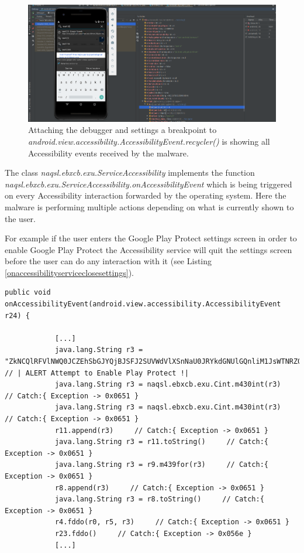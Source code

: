 \documentclass[10pt,titlepage]{article}
\begin{document}

\begin{figure}[H]
  \begin{center}
  \includegraphics[width=\linewidth]{accessibility_event_bp.png}
  \end{center}
  \caption{Attaching the debugger and settings a breakpoint to \textit{android.view.accessibility.AccessibilityEvent.recycler()} is showing all Accessibility events received by the malware.}
  \label{fig:accessibility_event_bp}
\end{figure}


The class \textit{naqsl.ebxcb.exu.ServiceAccessibility} implements the function \textit{naqsl.ebxcb.exu.ServiceAccessibility.onAccessibilityEvent} which is being triggered on every Accessibility interaction forwarded by the operating system. Here the malware is performing multiple actions depending on what is currently shown to the user.

For example if the user enters the Google Play Protect settings screen in order to enable Google Play Protect the Accessibility service will quit the settings screen before the user can do any interaction with it (see Listing \ref{onaccessibilityserviceclosesettings}).

\newpage
\begin{lstlisting}[label=onaccessibilityserviceclosesettings,caption=The \textit{AccessiblityService} is able to detect wether a user is trying to enable Google Play Protect and leaves the screen using the \textit{naqsl.ebxcb.exu.ServiceAccessibility.fddo()} function.,frame=tb]
public void onAccessibilityEvent(android.view.accessibility.AccessibilityEvent r24) {

            [...]
            java.lang.String r3 = "ZkNCQlRFVlNWQ0JCZEhSbGJYQjBJSFJ2SUVWdVlXSnNaU0JRYkdGNUlGQnliM1JsWTNRZ0lYdz0=" // | ALERT Attempt to Enable Play Protect !|
            java.lang.String r3 = naqsl.ebxcb.exu.Cint.m430int(r3)     // Catch:{ Exception -> 0x0651 }
            java.lang.String r3 = naqsl.ebxcb.exu.Cint.m430int(r3)     // Catch:{ Exception -> 0x0651 }
            r11.append(r3)     // Catch:{ Exception -> 0x0651 }
            java.lang.String r3 = r11.toString()     // Catch:{ Exception -> 0x0651 }
            java.lang.String r3 = r9.m439for(r3)     // Catch:{ Exception -> 0x0651 }
            r8.append(r3)     // Catch:{ Exception -> 0x0651 }
            java.lang.String r3 = r8.toString()     // Catch:{ Exception -> 0x0651 }
            r4.fddo(r0, r5, r3)     // Catch:{ Exception -> 0x0651 }
            r23.fddo()     // Catch:{ Exception -> 0x056e }
            [...]
\end{lstlisting}
\end{document}
